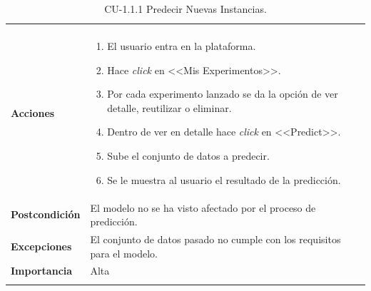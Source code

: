 \begin{longtable}[H]{@{}ll@{}}
\begin{minipage}[t]{0.71\columnwidth}
\begin{itemize}
\end{itemize}\strut
\end{minipage}\tabularnewline
\begin{minipage}[t]{0.23\columnwidth}\raggedright\strut
\textbf{Acciones}\strut
\end{minipage} & \begin{minipage}[t]{0.71\columnwidth}\raggedright\strut
\begin{enumerate}
\def\labelenumi{\arabic{enumi}.}
\tightlist
\item El usuario entra en la plataforma.
\item Hace \textit{click} en <<Mis Experimentos>>.
\item Por cada experimento lanzado se da la opción de ver detalle, reutilizar o eliminar.
\item Dentro de ver en detalle hace \textit{click} en <<Predict>>.
\item Sube el conjunto de datos a predecir.
\item Se le muestra al usuario el resultado de la predicción.
\end{enumerate}\strut
\end{minipage}\tabularnewline
\begin{minipage}[t]{0.23\columnwidth}\raggedright\strut
\textbf{Postcondición}\strut
\end{minipage} & \begin{minipage}[t]{0.71\columnwidth}\raggedright\strut
El modelo no se ha visto afectado por el proceso de predicción.\strut
\end{minipage}\tabularnewline
\begin{minipage}[t]{0.23\columnwidth}\raggedright\strut
\textbf{Excepciones}\strut
\end{minipage} & \begin{minipage}[t]{0.71\columnwidth}\raggedright\strut
El conjunto de datos pasado no cumple con los requisitos para el modelo.\strut
\end{minipage}\tabularnewline
\begin{minipage}[t]{0.23\columnwidth}\raggedright\strut
\textbf{Importancia}\strut
\end{minipage} & \begin{minipage}[t]{0.71\columnwidth}\raggedright\strut
Alta\strut
\end{minipage}\tabularnewline
\bottomrule
\caption{CU-1.1.1 Predecir Nuevas Instancias.}
\end{longtable}

